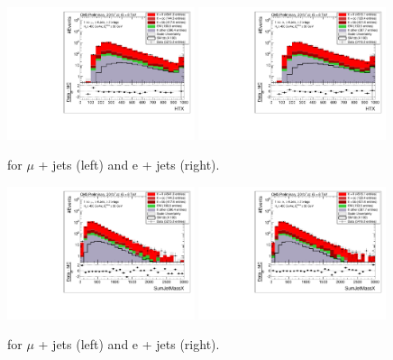 \begin{figure}[!ht]
    \includegraphics[clip, trim=0.15cm 0.15cm 0.15cm 0.1cm, width=0.49\textwidth]{images/Run1/HTX_StackLogY_Mu.pdf}
    \includegraphics[clip, trim=0.15cm 0.15cm 0.15cm 0.1cm, width=0.49\textwidth]{images/Run1/HTX_StackLogY_e.pdf}
    \caption{\HTX for $\mu$ + jets (left) and e + jets (right).}
    \label{fig:HTX}
\end{figure}

\begin{figure}[!ht]
    \includegraphics[clip, trim=0.15cm 0.15cm 0.15cm 0.1cm, width=0.49\textwidth]{images/Run1/SumJetMassX_StackLogY_Mu.pdf}
    \includegraphics[clip, trim=0.15cm 0.15cm 0.15cm 0.1cm, width=0.49\textwidth]{images/Run1/SumJetMassX_StackLogY_e.pdf}
    \caption{\sumjetmassX for $\mu$ + jets (left) and e + jets (right).}
    \label{fig:sumjetmassX}
\end{figure}

